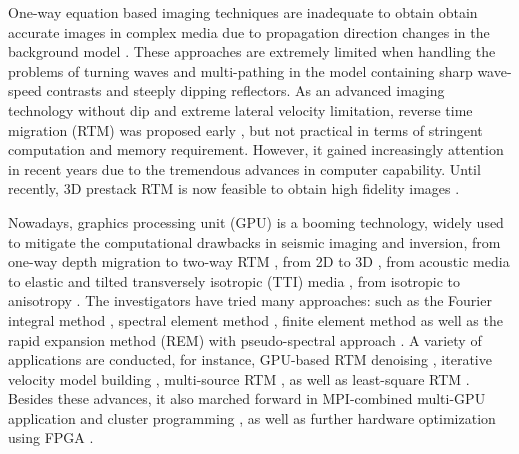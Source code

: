 One-way equation based imaging techniques are inadequate to obtain obtain accurate images in complex media due to propagation direction changes in the background model \citep{biondi20063d}. These approaches are extremely limited when handling the problems of turning waves and  multi-pathing  in the model containing sharp wave-speed contrasts and steeply dipping reflectors. As an advanced imaging technology without dip and extreme lateral velocity limitation, reverse time migration (RTM) was proposed early  \citep{baysal1983reverse,m1983migration}, but not practical in terms of stringent computation and memory requirement.
However, it gained increasingly attention in recent years due to the tremendous advances in computer capability. Until recently, 3D prestack RTM is now feasible to obtain high fidelity images \citep{yoon20033d,guitton2006least}.

Nowadays, graphics processing unit (GPU) is a booming technology, widely used to mitigate the computational drawbacks in seismic imaging and inversion, from one-way depth migration \citep{liu2012gpu,lin2012application} to two-way  RTM \citep{hussain2011implementation,micikevicius20093d,clapp2010selecting}, from 2D to 3D  \citep{micikevicius20093d,abdelkhalek2009fast,foltinek2009industrial,liu20133d,michea2010accelerating}, from acoustic media to elastic \citep{weiss2013solving} and tilted transversely isotropic (TTI) media  \citep{guo2013application,suh2011expanding}, from isotropic to anisotropy \citep{liu2009anisotropic}. The investigators have tried many approaches:  such as the  Fourier integral method \citep{liu2012fourier},  spectral element method \citep{komatitsch2010running}, finite element method \citep{komatitsch2010high} as well as the rapid expansion method (REM) with pseudo-spectral approach \citep{kim2012acceleration}. A variety of applications are conducted, for instance, GPU-based RTM denoising \citep{ying2013denoise}, iterative velocity model building \citep{ji2012iterative}, multi-source RTM \citep{boonyasiriwat2010multisource}, as well as least-square RTM \citep{leader2012least}. Besides these advances, it also marched forward in  MPI-combined multi-GPU application and cluster programming \citep{komatitsch2010high,suh2010cluster}, as well as further hardware optimization using FPGA  \citep{fu2011eliminating,medeiros2011fpga}.


